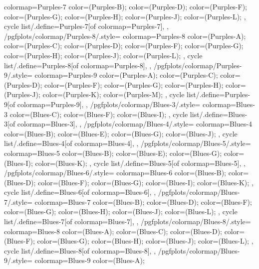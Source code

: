 {{    colormap={Purples-7}{
      color=(Purples-B);
      color=(Purples-D);
      color=(Purples-F);
      color=(Purples-G);
      color=(Purples-H);
      color=(Purples-J);
      color=(Purples-L);
    },
    cycle list/.define={Purples-7}{[of colormap=Purples-7]},
  },
  /pgfplots/colormap/Purples-8/.style={
    colormap={Purples-8}{
      color=(Purples-A);
      color=(Purples-C);
      color=(Purples-D);
      color=(Purples-F);
      color=(Purples-G);
      color=(Purples-H);
      color=(Purples-J);
      color=(Purples-L);
    },
    cycle list/.define={Purples-8}{[of colormap=Purples-8]},
  },
  /pgfplots/colormap/Purples-9/.style={
    colormap={Purples-9}{
      color=(Purples-A);
      color=(Purples-C);
      color=(Purples-D);
      color=(Purples-F);
      color=(Purples-G);
      color=(Purples-H);
      color=(Purples-J);
      color=(Purples-K);
      color=(Purples-M);
    },
    cycle list/.define={Purples-9}{[of colormap=Purples-9]},
  },
  /pgfplots/colormap/Blues-3/.style={
    colormap={Blues-3}{
      color=(Blues-C);
      color=(Blues-F);
      color=(Blues-I);
    },
    cycle list/.define={Blues-3}{[of colormap=Blues-3]},
  },
  /pgfplots/colormap/Blues-4/.style={
    colormap={Blues-4}{
      color=(Blues-B);
      color=(Blues-E);
      color=(Blues-G);
      color=(Blues-J);
    },
    cycle list/.define={Blues-4}{[of colormap=Blues-4]},
  },
  /pgfplots/colormap/Blues-5/.style={
    colormap={Blues-5}{
      color=(Blues-B);
      color=(Blues-E);
      color=(Blues-G);
      color=(Blues-I);
      color=(Blues-K);
    },
    cycle list/.define={Blues-5}{[of colormap=Blues-5]},
  },
  /pgfplots/colormap/Blues-6/.style={
    colormap={Blues-6}{
      color=(Blues-B);
      color=(Blues-D);
      color=(Blues-F);
      color=(Blues-G);
      color=(Blues-I);
      color=(Blues-K);
    },
    cycle list/.define={Blues-6}{[of colormap=Blues-6]},
  },
  /pgfplots/colormap/Blues-7/.style={
    colormap={Blues-7}{
      color=(Blues-B);
      color=(Blues-D);
      color=(Blues-F);
      color=(Blues-G);
      color=(Blues-H);
      color=(Blues-J);
      color=(Blues-L);
    },
    cycle list/.define={Blues-7}{[of colormap=Blues-7]},
  },
  /pgfplots/colormap/Blues-8/.style={
    colormap={Blues-8}{
      color=(Blues-A);
      color=(Blues-C);
      color=(Blues-D);
      color=(Blues-F);
      color=(Blues-G);
      color=(Blues-H);
      color=(Blues-J);
      color=(Blues-L);
    },
    cycle list/.define={Blues-8}{[of colormap=Blues-8]},
  },
  /pgfplots/colormap/Blues-9/.style={
    colormap={Blues-9}{
      color=(Blues-A);
}}}
